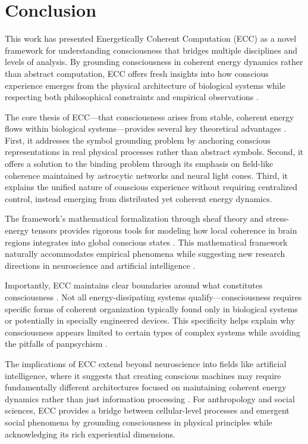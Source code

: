 \section{Conclusion}

This work has presented Energetically Coherent Computation (ECC) as a novel framework for understanding consciousness that bridges multiple disciplines and levels of analysis. By grounding consciousness in coherent energy dynamics rather than abstract computation, ECC offers fresh insights into how conscious experience emerges from the physical architecture of biological systems while respecting both philosophical constraints and empirical observations \cite{thompson2014waking}.

The core thesis of ECC—that consciousness arises from stable, coherent energy flows within biological systems—provides several key theoretical advantages \cite{koch2019feeling}. First, it addresses the symbol grounding problem by anchoring conscious representations in real physical processes rather than abstract symbols. Second, it offers a solution to the binding problem through its emphasis on field-like coherence maintained by astrocytic networks and neural light cones. Third, it explains the unified nature of conscious experience without requiring centralized control, instead emerging from distributed yet coherent energy dynamics.

The framework's mathematical formalization through sheaf theory and stress-energy tensors provides rigorous tools for modeling how local coherence in brain regions integrates into global conscious states \cite{varela2016embodied}. This mathematical framework naturally accommodates empirical phenomena while suggesting new research directions in neuroscience and artificial intelligence \cite{feinberg2016ancient}.

Importantly, ECC maintains clear boundaries around what constitutes consciousness \cite{churchland2013touching}. Not all energy-dissipating systems qualify—consciousness requires specific forms of coherent organization typically found only in biological systems or potentially in specially engineered devices. This specificity helps explain why consciousness appears limited to certain types of complex systems while avoiding the pitfalls of panpsychism \cite{goff2019galileo}.

The implications of ECC extend beyond neuroscience into fields like artificial intelligence, where it suggests that creating conscious machines may require fundamentally different architectures focused on maintaining coherent energy dynamics rather than just information processing \cite{chalmers2010character}. For anthropology and social sciences, ECC provides a bridge between cellular-level processes and emergent social phenomena by grounding consciousness in physical principles while acknowledging its rich experiential dimensions.

